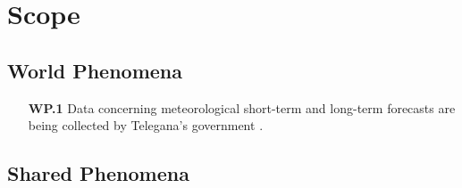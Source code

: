 \section{Scope}


\subsection{World Phenomena}

\begin{itemize}
    \item [\textbf{WP.1}] Data concerning meteorological short-term and long-term forecasts are being collected by Telegana's government \cite{tsdps}.
\end{itemize}

\subsection{Shared Phenomena}





